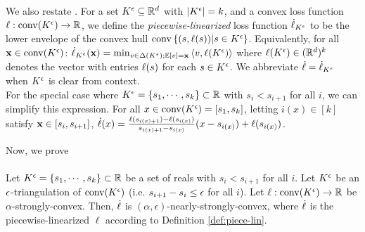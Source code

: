 We also restate .    For a set $K^{\epsilon} \subseteq \mathbb{R}^d$ with $\left|K^{\epsilon}\right|=k$, and a convex loss function $\ell: \mathrm{conv}(K^{\epsilon}) \to \mathbb{R}$, we define the \emph{piecewise-linearized} loss function $\dot{\ell}_{K^{\epsilon}}$ to be the lower envelope of the convex hull $\mathrm{conv} \left\{(s,\ell(s))|s \in K^{\epsilon}\right\}$.  Equivalently, for all $\mathbf{x} \in \mathrm{conv}(K^{\epsilon})$:
    $\dot{\ell}_{K^{\epsilon}}(\mathbf{x}) = \min_{v \in \Delta(K^{\epsilon}); \mathbb{E}[v] = \mathbf{x}} \left \langle v,\ell(K^{\epsilon}) \right \rangle$
    where $\ell(K^{\epsilon}) \in (\mathbb{R}^d)^k$ denotes the vector with entries $\ell(s)$ for each $s \in K^{\epsilon}$.  We abbreviate $\dot{\ell} = \dot{\ell}_{K^{\epsilon}}$ when $K^{\epsilon}$ is clear from context.\\
    
    For the special case where $K^{\epsilon} = \left\{s_1,\cdots,s_k\right\} \subset \mathbb{R}$ with $s_i<s_{i+1}$ for all $i$,  we can simplify this expression.  For all $x \in \mathrm{conv}(K^{\epsilon}) = [s_1,s_k]$, letting $i(x)\in [k]$ satisfy $\mathbf{x} \in [s_i,s_{i+1}]$, $
        \dot{\ell}(x) = \frac{\ell(s_{i(x)+1})-\ell(s_{i(x)})}{s_{i(x)+1}-s_{i(x)}}(x-s_{i(x)})+\ell(s_{i(x)})$.

Now, we prove

\paragraph{} Let $K^{\epsilon} = \left\{s_1,\cdots,s_k\right\} \subset \mathbb{R}$ be a set of reals with $s_i<s_{i+1}$ for all $i$.  Let $K^{\epsilon}$ be an $\epsilon$-triangulation of $\mathrm{conv}(K^{\epsilon})$ (i.e. $s_{i+1}-s_i \leq \epsilon$ for all $i$). Let $\ell: \mathrm{conv}(K^{\epsilon}) \to \mathbb{R}$ be $\alpha$-strongly-convex.  Then, $\dot{\ell}$ is $(\alpha,\epsilon)$-nearly-strongly-convex, where $\dot{\ell}$ is the piecewise-linearized $\ell$ according to Definition \ref{def:piece-lin}.

